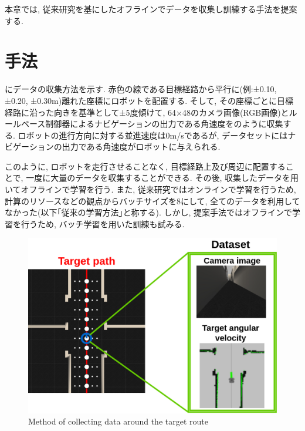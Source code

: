 
本章では, 従来研究を基にしたオフラインでデータを収集し訓練する手法を提案する.

\section{手法}

にデータの収集方法を示す. 赤色の線である目標経路から平行に(例:±0.10, ±0.20, ±0.30m)離れた座標にロボットを配置する. そして, その座標ごとに目標経路に沿った向きを基準として±5度傾けて, 64×48のカメラ画像(RGB画像)とルールベース制御器によるナビゲーションの出力である角速度をのように収集する. ロボットの進行方向に対する並進速度は0m/sであるが, データセットにはナビゲーションの出力である角速度がロボットに与えられる. \par このように, ロボットを走行させることなく, 目標経路上及び周辺に配置することで, 一度に大量のデータを収集することができる. その後, 収集したデータを用いてオフラインで学習を行う. また, 従来研究ではオンラインで学習を行うため, 計算のリソースなどの観点からバッチサイズを8にして, 全てのデータを利用してなかった(以下｢従来の学習方法｣と称する). しかし, 提案手法ではオフラインで学習を行うため, バッチ学習を用いた訓練も試みる. 

\newpage
  \begin{figure}[h]
  \centering
  \includegraphics[keepaspectratio, scale=0.25]{images/collect-data2.png}
  \caption{Method of collecting data around the target route}
  \label{Fig:collect-data2}
  \end{figure}

